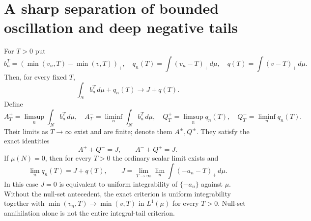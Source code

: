 \section{A sharp separation of bounded oscillation and deep negative tails}
\begin{theorem}\label{fresh:two-defects}
For $T>0$ put
\[
 b_n^T=(\min(v_n,T)-\min(v,T))_+,\quad
 q_n(T)=\int(v_n-T)_+\,d\mu,\quad
 q(T)=\int(v-T)_+\,d\mu.
\]
Then, for every fixed $T$,
\begin{equation}\label{fresh:sum}
 \int_N b_n^T\,d\mu+q_n(T)\longrightarrow J+q(T).
\end{equation}
Define
\[
 A_T^+=\limsup_n\int_N b_n^T\,d\mu,\quad
 A_T^-=\liminf_n\int_N b_n^T\,d\mu,\quad
 Q_T^+=\limsup_n q_n(T),\quad Q_T^-=\liminf_n q_n(T).
\]
Their limits as $T\to\infty$ exist and are finite; denote them
$A^\pm,Q^\pm$. They satisfy the exact identities
\[
 A^++Q^-=J,\qquad A^-+Q^+=J.
\]
If $\mu(N)=0$, then for every $T>0$ the ordinary scalar limit exists and
\begin{equation}\label{fresh:pure-tail}
 \lim_n q_n(T)=J+q(T),\qquad
 J=\lim_{T\to\infty}\lim_n\int(-a_n-T)_+\,d\mu.
\end{equation}
In this case $J=0$ is equivalent to uniform integrability of
$\{-a_n\}$ against $\mu$. Without the null-set antecedent, the exact
criterion is uniform integrability together with
$\min(v_n,T)\to\min(v,T)$ in $L^1(\mu)$ for every $T>0$.
Null-set annihilation alone is not the entire integral-tail criterion.
\end{theorem}
